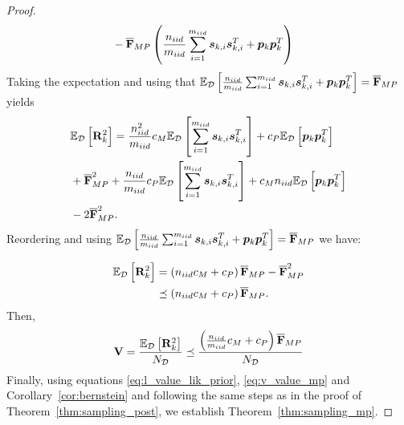 \begin{proof}
\begin{align*}
            &-\overline{\mathbf{F}}_{MP} \left({\frac{n_{iid}}{m_{iid}}\sum_{i=1}^{m_{iid}}\bm{s}_{k,i}\bm{s}_{k,i}^T}+\bm{p}_k\bm{p}_k^T\right)
    \end{align*}
    Taking the expectation and using that $\mathbb{E}_{\mathcal{D}}\left[\frac{n_{iid}}{m_{iid}}\sum_{i=1}^{m_{iid}}\bm{s}_{k,i}\bm{s}_{k,i}^T+\bm{p}_k\bm{p}_k^T\right]=\overline{\mathbf{F}}_{MP}$ yields
    \begin{align*}
        &\mathbb{E}_{\mathcal{D}}\left[\mathbf{R}_k^2\right]= \frac{n_{iid}^2}{m_{iid}}c_M\mathbb{E}_{\mathcal{D}}\left[\sum_{i=1}^{m_{iid}}\bm{s}_{k,i}\bm{s}_{k,i}^T\right]+c_P\mathbb{E}_{\mathcal{D}}\left[\bm{p}_k\bm{p}_k^T\right]\\
        &+\overline{\mathbf{F}}_{MP}^2+ \frac{n_{iid}}{m_{iid}}c_P\mathbb{E}_{\mathcal{D}}\left[\sum_{i=1}^{m_{iid}}\bm{s}_{k,i}\bm{s}_{k,i}^T\right]+c_Mn_{iid}\mathbb{E}_{\mathcal{D}}\left[\bm{p}_k\bm{p}_k^T\right]\\
        &-2\overline{\mathbf{F}}_{MP}^2.
    \end{align*}
    Reordering and using $\mathbb{E}_{\mathcal{D}}\left[\frac{n_{iid}}{m_{iid}}\sum_{i=1}^{m_{iid}}\bm{s}_{k,i}\bm{s}_{k,i}^T+\bm{p}_k\bm{p}_k^T\right]=\overline{\mathbf{F}}_{MP}$ we have:
    
    \begin{align*}
        \mathbb{E}_{\mathcal{D}}\left[\mathbf{R}_k^2\right]&=\left(n_{iid} c_M+c_P\right)\overline{\mathbf{F}}_{MP}-\overline{\mathbf{F}}_{MP}^2 \\
        &\preceq\left(n_{iid} c_M+c_P\right)\overline{\mathbf{F}}_{MP}.
    \end{align*}
    Then,
    \begin{equation}\label{eq:v_value_mp}
\mathbf{V}=\frac{\mathbb{E}_{\mathcal{D}}\left[\mathbf{R}_k^2\right]}{N_{\mathcal{D}}}\preceq\frac{\left(\frac{n_{iid}}{m_{iid}}c_M+c_P\right)\overline{\mathbf{F}}_{MP}}{N_{\mathcal{D}}} 
    \end{equation}
    Finally, {using}  equations \eqref{eq:l_value_lik_prior}, \eqref{eq:v_value_mp} {and} { Corollary~\ref{cor:bernstein} 
    {and following the same steps as  in the proof of Theorem~\ref{thm:sampling_post}},
    we establish Theorem~\ref{thm:sampling_mp}.}

\end{proof}